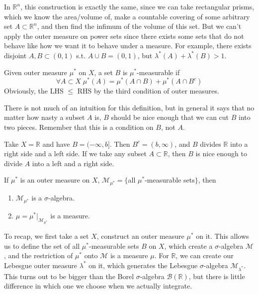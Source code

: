   In $\mathbb{R}^n$, this construction is exactly the same, since we can take rectangular prisms, which we know the area/volume of, make a countable covering of some arbitrary set $A \subset \mathbb{R}^n$, and then find the infimum of the volume of this set. But we can't apply the outer measure on power sets since there exists some sets that do not behave like how we want it to behave under a measure. For example, there exists disjoint $A, B \subset (0, 1)$ s.t. $A \cup B = (0, 1)$, but $\lambda^*(A) + \lambda^*(B) > 1$. 

  \begin{definition}
    Given outer measure $\mu^*$ on $X$, a set $B$ is $\mu^*$-measurable if 
    \begin{equation}
      \forall A \subset X \; \mu^*(A) = \mu^*(A \cap B) + \mu^*(A \cap B^c)
    \end{equation}
    Obviously, the LHS $\leq$ RHS by the third condition of outer measures. 
  \end{definition}

  There is not much of an intuition for this definition, but in general it says that no matter how nasty a subset $A$ is, $B$ should be nice enough that we can cut $B$ into two pieces. Remember that this is a condition on $B$, not $A$. 

  \begin{example}
    Take $X = \mathbb{R}$ and have $B = (-\infty, b]$. Then $B^c = (b, \infty)$, and $B$ divides $\mathbb{R}$ into a right side and a left side. If we take any subset $A \subset \mathbb{R}$, then $B$ is nice enough to divide $A$ into a left and a right side. 
  \end{example}

  \begin{theorem}
    If $\mu^*$ is an outer measure on $X$, $\mathcal{M}_{\mu^*} = \{$all $\mu^*$-measurable sets$\}$, then 
    \begin{enumerate}
      \item $\mathcal{M}_{\mu^*}$ is a $\sigma$-algebra. 
      \item $\mu = \mu^* \big|_{\mathcal{M}_{\mu^*}}$ is a measure. 
    \end{enumerate}
  \end{theorem}

  To recap, we first take a set $X$, construct an outer measure $\mu^*$ on it. This allows us to define the set of all $\mu^*$-measurable sets $B$ on $X$, which create a $\sigma$-algebra $\mathcal{M}$, and the restriction of $\mu^*$ onto $\mathcal{M}$ is a measure $\mu$. For $\mathbb{R}$, we can create our Lebesgue outer measure $\lambda^*$ on it, which generates the Lebesgue $\sigma$-algebra $\mathcal{M}_{\lambda^*}$. This turns out to be bigger than the Borel $\sigma$-algebra $\mathcal{B}(\mathbb{R})$, but there is little difference in which one we choose when we actually integrate. 


